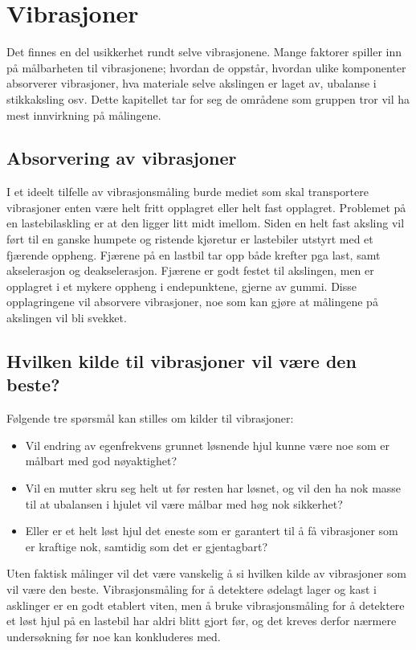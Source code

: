 \section{Vibrasjoner}
Det finnes en del usikkerhet rundt selve vibrasjonene. Mange faktorer spiller inn på målbarheten til vibrasjonene; 
hvordan de oppstår, hvordan ulike komponenter absorverer vibrasjoner, hva materiale selve akslingen er laget av, 
ubalanse i stikkaksling osv. Dette kapitellet tar for seg de områdene som gruppen tror vil ha mest innvirkning på målingene.
\subsection{Absorvering av vibrasjoner}
I et ideelt tilfelle av vibrasjonsmåling burde mediet som skal transportere vibrasjoner 
enten være helt fritt opplagret eller helt fast opplagret. Problemet på en lastebilaskling 
er at den ligger litt midt imellom. Siden en helt fast aksling vil ført til en ganske humpete 
og ristende kjøretur er lastebiler utstyrt med et fjærende oppheng. Fjærene på en lastbil
 tar opp både krefter pga last, samt akselerasjon og deakselerasjon. Fjærene er godt 
festet til akslingen, men er opplagret i et mykere oppheng i endepunktene, gjerne av gummi. 
Disse opplagringene vil absorvere vibrasjoner, noe som kan gjøre at målingene på akslingen vil bli svekket.

\subsection{Hvilken kilde til vibrasjoner vil være den beste?}
Følgende tre spørsmål kan stilles om kilder til vibrasjoner:
\begin{itemize}
	\item Vil endring av egenfrekvens grunnet løsnende hjul kunne være noe som er 
målbart med god nøyaktighet?
	\item Vil en mutter skru seg helt ut før resten har
 løsnet, og vil den ha nok masse til at ubalansen i hjulet vil være målbar med 
høg nok sikkerhet? 
	\item Eller er et helt løst hjul det eneste som er garantert til å få 
vibrasjoner som er kraftige nok, samtidig som det er gjentagbart?
\end{itemize}
Uten faktisk målinger vil det være vanskelig å si hvilken kilde av vibrasjoner 
som vil være den beste. Vibrasjonsmåling for å detektere ødelagt lager og 
kast i asklinger er en godt etablert viten, men å bruke vibrasjonsmåling for 
å detektere et løst hjul på en lastebil har aldri blitt gjort før, og det kreves 
derfor nærmere undersøkning før noe kan konkluderes med. 
